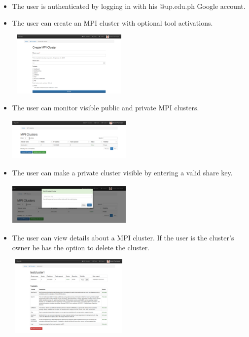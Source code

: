 \documentclass[journal]{./IEEE/IEEEtran}
\begin{document}
	\begin{itemize}
		\item The user is authenticated by logging in with his @up.edu.ph Google account.
		\item The user can create an MPI cluster with optional tool activations. \newline
			\begin{center}			
				\includegraphics[width=230px,height=120px]{./images/create_mpi.png}				
			\end{center}	
	
		\item The user can monitor visible public and private MPI clusters.  \newline	
		\begin{center}			
			\includegraphics[width=230px,height=80px]{./images/mpi_list_view.png}				
		\end{center}
		
	
		\item The user can make a private cluster visible by entering a valid share key. \newline
		\begin{center}			
			\includegraphics[width=230px,height=80px]{./images/add_private_cluster.png}		
		\end{center}	
		
		\item The user can view details about a MPI cluster. If the user is the cluster's owner he has the option to delete the cluster. \newline
		\begin{center}			
			\includegraphics[width=230px,height=150px]{./images/mpi_detail_view.png}			
		\end{center}	
		

\end{itemize}
\end{document}
